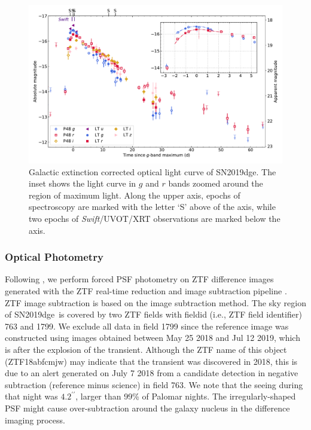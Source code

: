 \documentclass[twocolumn]{aastex63}
\newcommand{\name}{SN2019dge}
\newcommand{\swift}{\textit{Swift}}
\begin{document}
\begin{CJK*}{UTF8}{gbsn}
\begin{figure}[htbp!]
	\centering
	\includegraphics[width=\textwidth]{figures/lightcurve.pdf}
	\caption{Galactic extinction corrected optical light curve of \name. The inset shows 
		the light curve in $g$ and $r$ bands zoomed around the region of maximum light. Along the 
		upper axis, epochs of spectroscopy are marked with the letter `S' above of the axis, while two 
		epochs of \swift/UVOT/XRT observations are marked below the axis.\label{fig:lightcurve}}
\end{figure}
\subsubsection{Optical Photometry}
Following \citet{Yao2019}, we perform forced PSF photometry on ZTF difference 
images generated with the ZTF real-time reduction and image subtraction pipeline \citep{Masci2019}. 
ZTF image subtraction is based on the \citet{Zackay2016} image subtraction method. The sky region of 
\name\ is covered by two ZTF fields with fieldid (i.e., ZTF field 
identifier) 763 and 1799. We exclude all data in field 1799 since the reference image was constructed 
using images obtained between May 25 2018 and Jul 12 2019, which is after the explosion of the 
transient. Although the ZTF name of 
this object 
(ZTF18abfcmjw) may indicate that the transient was discovered in 2018, this is due to an alert 
generated on July 7 2018 from a candidate detection in negative subtraction (reference minus science) 
in field 763. We note that the seeing during that night was $4.2^{\prime\prime}$, larger than 99\% of 
Palomar nights. 
The irregularly-shaped PSF might cause over-subtraction around the galaxy nucleus in the difference 
imaging process.


\end{CJK*}
\end{document}
